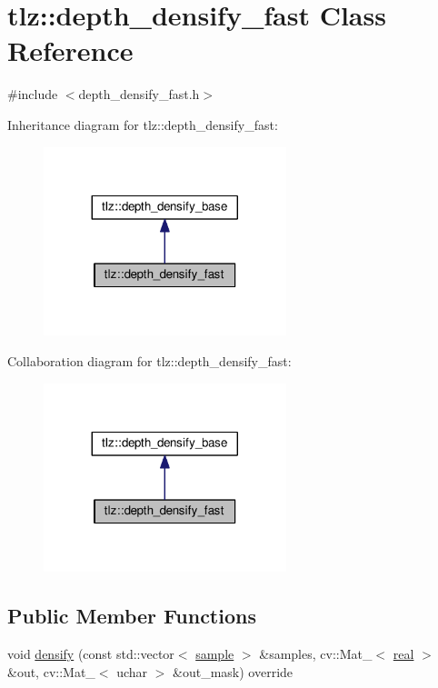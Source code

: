 \hypertarget{classtlz_1_1depth__densify__fast}{}\section{tlz\+:\+:depth\+\_\+densify\+\_\+fast Class Reference}
\label{classtlz_1_1depth__densify__fast}


{\ttfamily \#include $<$depth\+\_\+densify\+\_\+fast.\+h$>$}



Inheritance diagram for tlz\+:\+:depth\+\_\+densify\+\_\+fast\+:
\nopagebreak
\begin{figure}[H]
\begin{center}
\leavevmode
\includegraphics[width=200pt]{classtlz_1_1depth__densify__fast__inherit__graph}
\end{center}
\end{figure}


Collaboration diagram for tlz\+:\+:depth\+\_\+densify\+\_\+fast\+:
\nopagebreak
\begin{figure}[H]
\begin{center}
\leavevmode
\includegraphics[width=200pt]{classtlz_1_1depth__densify__fast__coll__graph}
\end{center}
\end{figure}
\subsection*{Public Member Functions}
\begin{DoxyCompactItemize}
\item 
void \hyperlink{classtlz_1_1depth__densify__fast_a2d2e3c128c05ce717d4e3df3fefc308e}{densify} (const std\+::vector$<$ \hyperlink{classtlz_1_1depth__densify__base_a79b5945bdb65c2e1d988bf07ad730a09}{sample} $>$ \&samples, cv\+::\+Mat\+\_\+$<$ \hyperlink{namespacetlz_a15fd37cce97f2b8b606af18c2615f602}{real} $>$ \&out, cv\+::\+Mat\+\_\+$<$ uchar $>$ \&out\+\_\+mask) override
\end{DoxyCompactItemize}
